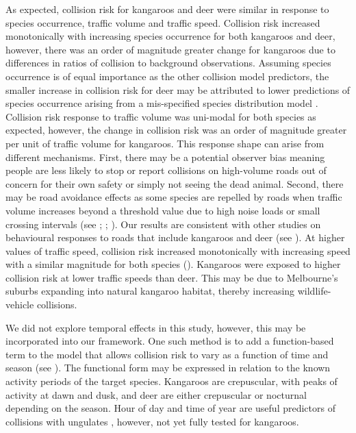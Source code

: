 As expected, collision risk for kangaroos and deer were similar in response to species occurrence, traffic volume and traffic speed.  Collision risk increased monotonically with increasing species occurrence for both kangaroos and deer, however, there was an order of magnitude greater change for kangaroos due to differences in ratios of collision to background observations.  Assuming species occurrence is of equal importance as the other collision model predictors, the smaller increase in collision risk for deer may be attributed to lower predictions of species occurrence arising from a mis-specified species distribution model \citep{guil15}.  Collision risk response to traffic volume was uni-modal for both species as expected, however, the change in collision risk was an order of magnitude greater per unit of traffic volume for kangaroos.  This response shape can arise from different mechanisms.  First, there may be a potential observer bias meaning people are less likely to stop or report collisions on high-volume roads out of concern for their own safety or simply not seeing the dead animal.  Second, there may be road avoidance effects as some species are repelled by roads when traffic volume increases beyond a threshold value due to high noise loads or small crossing intervals (see \cite{vanl04}; \cite{seil05}; \cite{gagn07}).  Our results are consistent with other studies on behavioural responses to roads that include kangaroos and deer (see \cite{jaco16}).  At higher values of traffic speed, collision risk increased monotonically with increasing speed with a similar magnitude for both species ().  Kangaroos were exposed to higher collision risk at lower traffic speeds than deer.  This may be due to Melbourne’s suburbs expanding into natural kangaroo habitat, thereby increasing wildlife-vehicle collisions.

We did not explore temporal effects in this study, however, this may be incorporated into our framework.  One such method is to add a function-based term to the model that allows collision risk to vary as a function of time and season (see ). The functional form may be expressed in relation to the known activity periods of the target species. Kangaroos are crepuscular, with peaks of activity at dawn and dusk, and deer are either crepuscular or nocturnal depending on the season.  Hour of day and time of year are useful predictors of collisions with ungulates \citep{meis14,moun09}, however, not yet fully tested for kangaroos.

